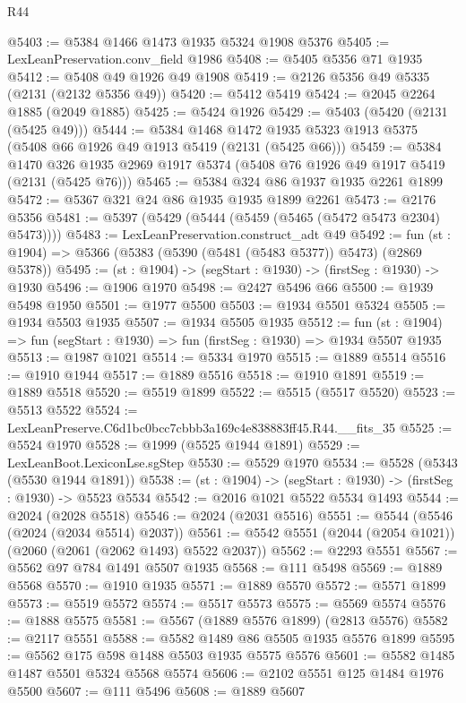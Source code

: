 \begin{lexlean}{R44}
\begin{coremodule}
@5403 := @5384 @1466 @1473 @1935 @5324 @1908 @5376
@5405 := LexLeanPreservation.conv_field @1986
@5408 := @5405 @5356 @71 @1935
@5412 := @5408 @49 @1926 @49 @1908
@5419 := @2126 @5356 @49 @5335 (@2131 (@2132 @5356 @49))
@5420 := @5412 @5419
@5424 := @2045 @2264 @1885 (@2049 @1885)
@5425 := @5424 @1926
@5429 := @5403 (@5420 (@2131 (@5425 @49)))
@5444 := @5384
    @1468
    @1472
    @1935
    @5323
    @1913
    @5375
    (@5408 @66 @1926 @49 @1913 @5419 (@2131 (@5425 @66)))
@5459 := @5384
    @1470
    @326
    @1935
    @2969
    @1917
    @5374
    (@5408 @76 @1926 @49 @1917 @5419 (@2131 (@5425 @76)))
@5465 := @5384 @324 @86 @1937 @1935 @2261 @1899
@5472 := @5367 @321 @24 @86 @1935 @1935 @1899 @2261
@5473 := @2176 @5356
@5481 := @5397 (@5429 (@5444 (@5459 (@5465 (@5472 @5473 @2304) @5473))))
@5483 := LexLeanPreservation.construct_adt @49
@5492 := fun (st : @1904) => @5366 (@5383 (@5390 (@5481 (@5483 @5377)) @5473) (@2869 @5378))
@5495 := (st : @1904) -> (segStart : @1930) -> (firstSeg : @1930) -> @1930
@5496 := @1906 @1970
@5498 := @2427 @5496 @66
@5500 := @1939 @5498 @1950
@5501 := @1977 @5500
@5503 := @1934 @5501 @5324
@5505 := @1934 @5503 @1935
@5507 := @1934 @5505 @1935
@5512 := fun (st : @1904) => fun (segStart : @1930) => fun (firstSeg : @1930) => @1934 @5507 @1935
@5513 := @1987 @1021
@5514 := @5334 @1970
@5515 := @1889 @5514
@5516 := @1910 @1944
@5517 := @1889 @5516
@5518 := @1910 @1891
@5519 := @1889 @5518
@5520 := @5519 @1899
@5522 := @5515 (@5517 @5520)
@5523 := @5513 @5522
@5524 := LexLeanPreserve.C6d1bc0bcc7cbbb3a169c4e838883ff45.R44.__fits_35
@5525 := @5524 @1970
@5528 := @1999 (@5525 @1944 @1891)
@5529 := LexLeanBoot.LexiconLse.sgStep
@5530 := @5529 @1970
@5534 := @5528 (@5343 (@5530 @1944 @1891))
@5538 := (st : @1904) -> (segStart : @1930) -> (firstSeg : @1930) -> @5523 @5534
@5542 := @2016 @1021 @5522 @5534 @1493
@5544 := @2024 (@2028 @5518)
@5546 := @2024 (@2031 @5516)
@5551 := @5544 (@5546 (@2024 (@2034 @5514) @2037))
@5561 := @5542 @5551 (@2044 (@2054 @1021)) (@2060 (@2061 (@2062 @1493) @5522 @2037))
@5562 := @2293 @5551
@5567 := @5562 @97 @784 @1491 @5507 @1935
@5568 := @111 @5498
@5569 := @1889 @5568
@5570 := @1910 @1935
@5571 := @1889 @5570
@5572 := @5571 @1899
@5573 := @5519 @5572
@5574 := @5517 @5573
@5575 := @5569 @5574
@5576 := @1888 @5575
@5581 := @5567 (@1889 @5576 @1899) (@2813 @5576)
@5582 := @2117 @5551
@5588 := @5582 @1489 @86 @5505 @1935 @5576 @1899
@5595 := @5562 @175 @598 @1488 @5503 @1935 @5575 @5576
@5601 := @5582 @1485 @1487 @5501 @5324 @5568 @5574
@5606 := @2102 @5551 @125 @1484 @1976 @5500
@5607 := @111 @5496
@5608 := @1889 @5607

\end{coremodule}
\end{lexlean}
